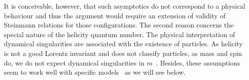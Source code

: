 It is conceivable, however, that such asymptotics do  not correspond to a physical behaviour and thus the argument would require an extension of validity of Steinmann relations for those configurations.
The second reason concerns the special nature of the helicity quantum number.
The physical interpretation of dynamical singularities are associated with the existence of particles.
As helicity is not a good Lorentz invariant and does not classify particles, as mass and spin do, we do not expect dynamical singularities in $m$~\cite{Brower:1974yv, Abarbanel:1972ayr}.
Besides, these assumptions seem to work well with specific models~\cite{Brower:1974yv,Schwarz:1973yz} as we will see below.

